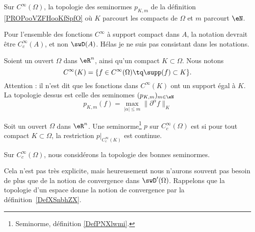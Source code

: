 \begin{definition}  \label{DefFGGCooTYgmYf}
	Sur \(  C^{\infty}(\Omega)\), la topologie des seminormes \( p_{K,m}\) de la définition \ref{PROPooVZFHooKfSpfO} où \( K\) parcourt les compacts de \( \Omega\) et \( m\) parcourt \( \eN\).
\end{definition}

\begin{normaltext}
	Pour l'ensemble des fonctions \( C^{\infty}\) à support compact dans \( A\), la notation devrait être \( C^{\infty}_c(A)\), et non \( \swD(A)\). Hélas je ne suis pas consistant dans les notations.
\end{normaltext}


\begin{definition}		\label{DEFooJJJYooIrekSp}
	Soient un ouvert \( \Omega\) dans \( \eR^n\), ainsi qu'un compact \( K\subset \Omega\). Nous notons
	\begin{equation}
		C^{\infty}(K)=\{ f\in C^{\infty}(\Omega)\tq \supp(f)\subset K \}.
	\end{equation}
	Attention : il n'est dit que les fonctions dans \( C^{\infty}(K)\) ont un support égal à \( K\). La topologie dessus est celle des seminomes \( (p_{K,m})_{m\in \eN}\)
	\begin{equation}		\label{EQooXGINooYJqmtD}
		p_{K,m}(f)=\max_{| \alpha |\leq m}\| \partial^{\alpha}f \|_K
	\end{equation}
\end{definition}

\begin{definition}		\label{DEFooVSCRooLyYBzT}
	Soit un ouvert \( \Omega\) dans \( \eR^n\). Une seminorme\footnote{Seminorme, définition \ref{DefPNXlwmi}.} \( p\) sur \( C^{\infty}_c(\Omega)\) est  si pour tout compact \( K\subset \Omega\), la restriction \( p|_{C^{\infty}_c(K)}\) est continue.

	Sur \( C^{\infty}_c(\Omega)\), nous considérons la topologie des bonnes seminormes.
\end{definition}

Cela n'est pas très explicite, mais heureusement nous n'aurons souvent pas besoin de plus que de la notion de convergence dans \( \swD'(\Omega)\). Rappelons que la topologie d'un espace donne la notion de convergence par la définition~\ref{DefXSnbhZX}.


